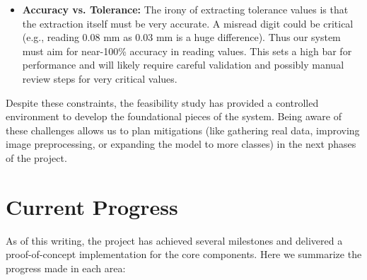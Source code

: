 \documentclass[11pt,a4paper]{article}
\begin{document}
\begin{itemize}
  \item \textbf{Accuracy vs. Tolerance:} The irony of extracting tolerance values is that the extraction itself must be very accurate. A misread digit could be critical (e.g., reading 0.08 mm as 0.03 mm is a huge difference). Thus our system must aim for near-100\% accuracy in reading values. This sets a high bar for performance and will likely require careful validation and possibly manual review steps for very critical values.
\end{itemize}

Despite these constraints, the feasibility study has provided a controlled environment to develop the foundational pieces of the system. Being aware of these challenges allows us to plan mitigations (like gathering real data, improving image preprocessing, or expanding the model to more classes) in the next phases of the project.

\section{Current Progress}
As of this writing, the project has achieved several milestones and delivered a proof-of-concept implementation for the core components. Here we summarize the progress made in each area:
\end{document}
